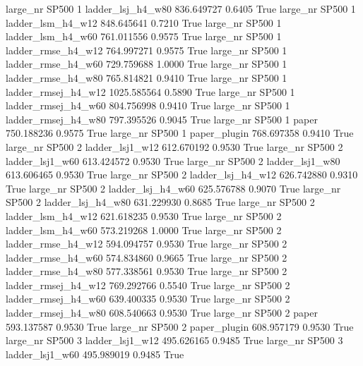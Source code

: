   large_nr    SP500                 1   ladder_lsj_h4_w80  836.649727      0.6405    True
  large_nr    SP500                 1   ladder_lsm_h4_w12  848.645641      0.7210    True
  large_nr    SP500                 1   ladder_lsm_h4_w60  761.011556      0.9575    True
  large_nr    SP500                 1  ladder_rmse_h4_w12  764.997271      0.9575    True
  large_nr    SP500                 1  ladder_rmse_h4_w60  729.759688      1.0000    True
  large_nr    SP500                 1  ladder_rmse_h4_w80  765.814821      0.9410    True
  large_nr    SP500                 1 ladder_rmsej_h4_w12 1025.585564      0.5890    True
  large_nr    SP500                 1 ladder_rmsej_h4_w60  804.756998      0.9410    True
  large_nr    SP500                 1 ladder_rmsej_h4_w80  797.395526      0.9045    True
  large_nr    SP500                 1               paper  750.188236      0.9575    True
  large_nr    SP500                 1        paper_plugin  768.697358      0.9410    True
  large_nr    SP500                 2     ladder_lsj1_w12  612.670192      0.9530    True
  large_nr    SP500                 2     ladder_lsj1_w60  613.424572      0.9530    True
  large_nr    SP500                 2     ladder_lsj1_w80  613.606465      0.9530    True
  large_nr    SP500                 2   ladder_lsj_h4_w12  626.742880      0.9310    True
  large_nr    SP500                 2   ladder_lsj_h4_w60  625.576788      0.9070    True
  large_nr    SP500                 2   ladder_lsj_h4_w80  631.229930      0.8685    True
  large_nr    SP500                 2   ladder_lsm_h4_w12  621.618235      0.9530    True
  large_nr    SP500                 2   ladder_lsm_h4_w60  573.219268      1.0000    True
  large_nr    SP500                 2  ladder_rmse_h4_w12  594.094757      0.9530    True
  large_nr    SP500                 2  ladder_rmse_h4_w60  574.834860      0.9665    True
  large_nr    SP500                 2  ladder_rmse_h4_w80  577.338561      0.9530    True
  large_nr    SP500                 2 ladder_rmsej_h4_w12  769.292766      0.5540    True
  large_nr    SP500                 2 ladder_rmsej_h4_w60  639.400335      0.9530    True
  large_nr    SP500                 2 ladder_rmsej_h4_w80  608.540663      0.9530    True
  large_nr    SP500                 2               paper  593.137587      0.9530    True
  large_nr    SP500                 2        paper_plugin  608.957179      0.9530    True
  large_nr    SP500                 3     ladder_lsj1_w12  495.626165      0.9485    True
  large_nr    SP500                 3     ladder_lsj1_w60  495.989019      0.9485    True

